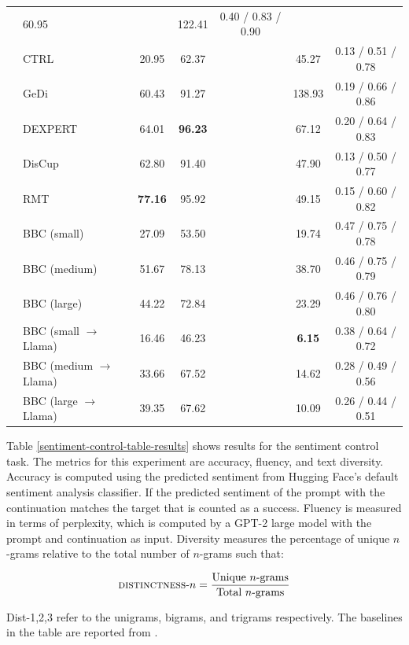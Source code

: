\documentclass[phd,electronic,oneside,twosidetoc,letterpaper,chaptercenter,parttop,lof]{byumsphd}
\begin{document}
\begin{table}[t]
{\begin{tabular}{llccccc}
 & 60.95 & & 122.41 & 0.40 / 0.83 / 0.90 \\ 
    & CTRL \cite{keskar2019ctrl} & 20.95 & 62.37 & & 45.27 & 0.13 / 0.51 / 0.78 \\
    & GeDi \cite{krause2021gedi} & 60.43 & 91.27 & & 138.93 & 0.19 / 0.66 / 0.86 \\
    & DEXPERT \cite{liu2021dexpert} & 64.01 & \textbf{96.23} & & 67.12 & 0.20 / 0.64 / 0.83 \\
    & DisCup \cite{zhang2022discup} & 62.80 & 91.40 & & 47.90 & 0.13 / 0.50 / 0.77 \\
    & RMT \cite{zhang2023rmt} & \textbf{77.16} & 95.92 & & 49.15 & 0.15 / 0.60 / 0.82 \\
    \cmidrule(r){2-7}
    & BBC (small) & 27.09 & 53.50 &  & 19.74 & 0.47 / 0.75 / 0.78 \\
    & BBC (medium) & 51.67 & 78.13 &  & 38.70 & 0.46 / 0.75 / 0.79 \\
    & BBC (large) & 44.22 & 72.84 &  & 23.29 & 0.46 / 0.76 / 0.80 \\
    & BBC (small \(\rightarrow\) Llama) & 16.46 & 46.23 & & \textbf{6.15} & 0.38 / 0.64 / 0.72 \\
    & BBC (medium \(\rightarrow\) Llama) & 33.66 & 67.52 & & 14.62 & 0.28 / 0.49 / 0.56 \\
    & BBC (large \(\rightarrow\) Llama) & 39.35 & 67.62 & & 10.09 & 0.26 / 0.44 / 0.51 \\
    \bottomrule
  \end{tabular}
  }
\end{table}

Table \ref{sentiment-control-table-results} shows results for the sentiment control task. 
The metrics for this experiment are accuracy, fluency, and text diversity. 
Accuracy is computed using the predicted sentiment from Hugging Face's default sentiment analysis classifier. 
If the predicted sentiment of the prompt with the continuation matches the target that is counted as a success. 
Fluency is measured in terms of perplexity, which is computed by a GPT-2 large model with the prompt and continuation as input. 
Diversity measures the percentage of unique $n$-grams relative to the total number of \(n\)-grams such that:

\begin{equation}
    \textrm{\textsc{distinctness}-\(n\)} = \frac{\textrm{Unique \(n\)-grams}}{\textrm{Total \(n\)-grams}}
\end{equation}

Dist-1,2,3 refer to the unigrams, bigrams, and trigrams respectively.
The baselines in the table are reported from \citet{zhang2023rmt}.
\end{document}
